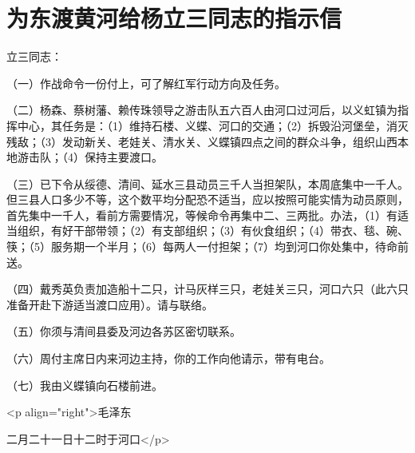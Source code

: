 \section[为东渡黄河给杨立三同志的指示信（一九四六年二月二十一日）]{为东渡黄河给杨立三同志的指示信}


立三同志：

（一）作战命令一份付上，可了解红军行动方向及任务。

（二）杨森、蔡树藩、赖传珠领导之游击队五六百人由河口过河后，以义虹镇为指挥中心，其任务是：（1）维持石楼、义蝶、河口的交通；（2）拆毁沿河堡垒，消灭残敌；（3）发动新关、老娃关、清水关、义蝶镇四点之间的群众斗争，组织山西本地游击队；（4）保持主要渡口。

（三）已下令从绥德、清间、延水三县动员三千人当担架队，本周底集中一千人。但三县人口多少不等，这个数平均分配恐不适当，应以按照可能实情为动员原则，首先集中一千人，看前方需要情况，等候命令再集中二、三两批。办法，（1）有适当组织，有好干部带领；（2）有支部组织；（3）有伙食组织；（4）带衣、毯、碗、筷；（5）服务期一个半月；（6）每两人一付担架；（7）均到河口你处集中，待命前送。

（四）戴秀英负责加造船十二只，计马灰样三只，老娃关三只，河口六只（此六只准备开赴下游适当渡口应用）。请与联络。

（五）你须与清间县委及河边各苏区密切联系。

（六）周付主席日内来河边主持，你的工作向他请示，带有电台。

（七）我由义蝶镇向石楼前进。

<p align="right">毛泽东

二月二十一日十二时于河口</p>

